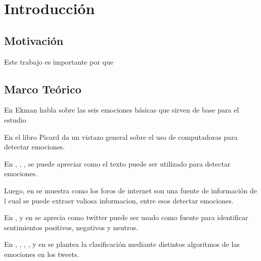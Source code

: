 \chapter{Introducción}






\section{Motivación}

Este trabajo es importante por que 



\section{Marco Teórico}

En \cite{ekman1993facial} Ekman habla sobre las seis emociones básicas que sirven de base para el estudio

En el libro \cite{picard2000affective} Picard da un vistazo general sobre el uso de computadoras para detectar emociones.

En \cite{pang2002thumbs}, \cite{dave2003mining}, \cite{wilson2005recognizing}, \cite{alm2005emotions} se puede apreciar como el texto puede ser utilizado para detectar emociones.

Luego, en \cite{pang2008opinion} se muestra como los foros de internet son una fuente de información de l cual se puede extraer valiosa informacion, entre esos detectar emociones.

En \cite{pak2010twitter}, \cite{kouloumpis2011twitter} y en \cite{go2009twitter} se aprecia como twitter puede ser usado como fuente para identificar sentimientos positivos, negativos y neutros.

En \cite{hasan2014emotex}, \cite{bollen2011modeling}, \cite{strapparava2008learning}, \cite{strapparava2007semeval}, y en \cite{roberts2012empatweet} se plantea la clasificación mediante distintos algoritmos de las emociones en los tweets.





